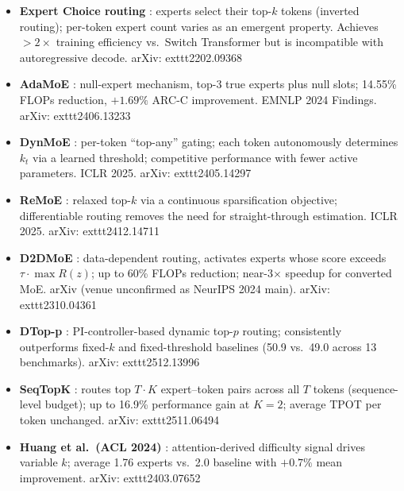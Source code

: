\documentclass[11pt]{article}
\begin{document}
\begin{itemize}
  \item \textbf{Expert Choice routing} \cite{ZhouLepikhinEtAl2022}: experts select their top-$k$ tokens (inverted routing); per-token expert count varies as an emergent property.
    Achieves $>2\times$ training efficiency vs.\ Switch Transformer but is incompatible with autoregressive decode.
    arXiv:	exttt{2202.09368}

  \item \textbf{AdaMoE} \cite{ZengZhaoEtAl2024}: null-expert mechanism, top-3 true experts plus null slots; 14.55\% FLOPs reduction, $+1.69\%$ ARC-C improvement.
    EMNLP 2024 Findings.
    arXiv:	exttt{2406.13233}

  \item \textbf{DynMoE} \cite{GuoChengEtAl2024}: per-token ``top-any'' gating; each token autonomously determines $k_t$ via a learned threshold; competitive performance with fewer active parameters.
    ICLR 2025.
    arXiv:	exttt{2405.14297}

  \item \textbf{ReMoE} \cite{WangZhuEtAl2024}: relaxed top-$k$ via a continuous sparsification objective; differentiable routing removes the need for straight-through estimation.
    ICLR 2025.
    arXiv:	exttt{2412.14711}

  \item \textbf{D2DMoE} \cite{SzatkowskiEtAl2024}: data-dependent routing, activates experts whose score exceeds $\tau \cdot \max R(z)$; up to 60\% FLOPs reduction; near-3$\times$ speedup for converted MoE.
    arXiv (venue unconfirmed as NeurIPS 2024 main).
    arXiv:	exttt{2310.04361}

  \item \textbf{DTop-p} \cite{JinEtAl2025}: PI-controller-based dynamic top-$p$ routing; consistently outperforms fixed-$k$ and fixed-threshold baselines (50.9 vs.\ 49.0 across 13 benchmarks).
    arXiv:	exttt{2512.13996}

  \item \textbf{SeqTopK} \cite{WenEtAl2025}: routes top $T{\cdot}K$ expert--token pairs across all $T$ tokens (sequence-level budget); up to 16.9\% performance gain at $K=2$; average TPOT per token unchanged.
    arXiv:	exttt{2511.06494}

  \item \textbf{Huang et al.\ (ACL 2024)} \cite{HuangAnEtAl2024}: attention-derived difficulty signal drives variable $k$; average 1.76 experts vs.\ 2.0 baseline with $+0.7\%$ mean improvement.
    arXiv:	exttt{2403.07652}


\end{itemize}
\end{document}
